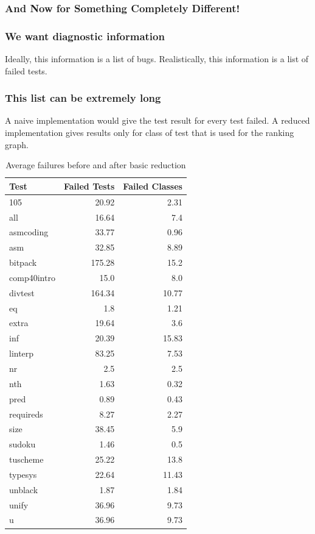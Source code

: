 \documentclass[svgnames,14pt]{beamer}
\theoremstyle{definition}
\begin{document}
\begin{frame}
\frametitle{And Now for Something Completely Different!}
\end{frame}

\begin{frame}
\frametitle{We want diagnostic information}
Ideally, this information is a list of bugs.
\newline\newline
Realistically, this information is a list of failed tests.
\end{frame}

\begin{frame}
\frametitle{This list can be extremely long}
A naive implementation would give the test result for every test failed.
\newline\newline
A reduced implementation gives results only for class of test that is used for the ranking graph.
\end{frame}

\begin{frame}
\begin{table}[t]
\def\?{\phantom0}
\centering
\fontsize{8}{3}\selectfont
\begin{tabular}{ | l | r | r |}
\hline
Test & Failed Tests & Failed Classes \\
\hline
105 & 20.92 & 2.31 \\
all & 16.64 & 7.4 \\
asmcoding & 33.77 & 0.96 \\
asm & 32.85 & 8.89 \\
bitpack & 175.28 & 15.2 \\
comp40intro & 15.0 & 8.0 \\
divtest & 164.34 & 10.77 \\
eq & 1.8 & 1.21 \\
extra & 19.64 & 3.6 \\
inf & 20.39 & 15.83 \\
linterp & 83.25 & 7.53 \\
nr & 2.5 & 2.5 \\
nth & 1.63 & 0.32 \\
pred & 0.89 & 0.43 \\
requireds & 8.27 & 2.27 \\
size & 38.45 & 5.9 \\
sudoku & 1.46 & 0.5 \\
tuscheme & 25.22 & 13.8 \\
typesys & 22.64 & 11.43 \\
unblack & 1.87 & 1.84 \\
unify & 36.96 & 9.73 \\
u & 36.96 & 9.73 \\
\hline
\end{tabular}
\caption{Average failures before and after basic reduction}
\end{table}
\end{frame}
\end{document}
